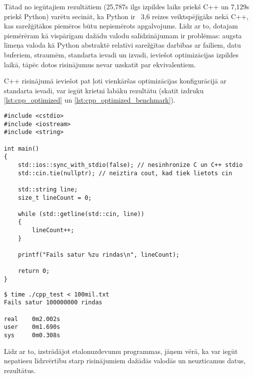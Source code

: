 Tātad no iegūtajiem rezultātiem (25,787s ilgs izpildes laiks priekš C++ un
7,129s priekš Python) varētu secināt, ka Python ir ~3,6 reizes veiktspējīgāks
nekā C++, kas sarežģītākos piemēros būtu nepiemērots apgalvojums. Līdz ar to,
dotajam piemērēram kā vispārīgam dažādu valodu salīdzinājumam ir problēmas:
augsta līmeņa valoda kā Python abstraktē relatīvi sarežģītas darbības ar
failiem, datu buferiem, straumēm, standarta ievadi un izvadi, ieviešot
optimizācijas izpildes laikā, tāpēc dotos risinājumus nevar uzskatīt par
ekvivalentiem.

C++ risinājumā ieviešot pat ļoti vienkāršas optimizācijas konfigurācijā ar
standarta ievadi, var iegūt krietni labāku rezultātu (skatīt izdruku
\ref{lst:cpp_optimized} un \ref{lst:cpp_optimized_benchmark}).

\begin{lstlisting}[caption={Optimizēta vienkārša faila apstrāde valodā C++ caur standarta ievadi },
  label=lst:cpp_optimized,
  captionpos=t
]
#include <cstdio>
#include <iostream>
#include <string>

int main()
{
    std::ios::sync_with_stdio(false); // nesinhronize C un C++ stdio 
    std::cin.tie(nullptr); // neiztira cout, kad tiek lietots cin

    std::string line;
    size_t lineCount = 0;

    while (std::getline(std::cin, line))
    {
        lineCount++;
    }

    printf("Fails satur %zu rindas\n", lineCount);

    return 0;
}
\end{lstlisting}


\begin{lstlisting}[caption={Optimizētā C++ etalonuzdevuma rezultāti failam ar 100 miljoniem rindu},
  label=lst:cpp_optimized_benchmark,
  captionpos=t
]
$ time ./cpp_test < 100mil.txt 
Fails satur 100000000 rindas 

real    0m2.002s
user    0m1.690s
sys     0m0.308s
\end{lstlisting}

Līdz ar to, izstrādājot etalonuzdevumu programmas, jāņem vērā, ka var iegūt
nepatiesu līdzvērtību starp risinājumiem dažādās valodās un neuzticamus datus,
rezultātus.

